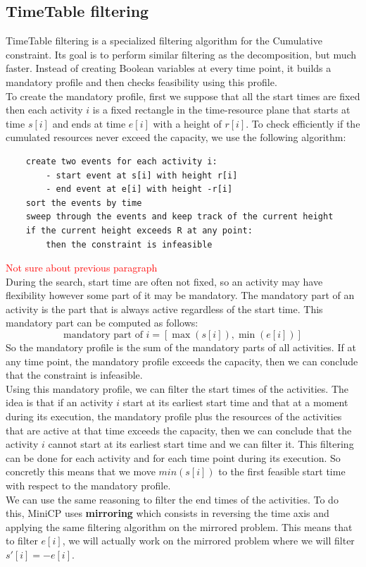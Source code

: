 \documentclass[12pt, openany]{report}
\theoremstyle{definition}
\begin{document}
\subsection{TimeTable filtering}
TimeTable filtering is a specialized filtering algorithm for the Cumulative constraint. Its goal is to perform similar filtering as the decomposition, but much faster. Instead of creating Boolean variables at every time point, it builds a mandatory profile and then checks feasibility using this profile.\\
To create the mandatory profile, first we suppose that all the start times are fixed then each activity $i$ is a fixed rectangle in the time-resource plane that starts at time $s[i]$ and ends at time $e[i]$ with a height of $r[i]$. To check efficiently if the cumulated resources never exceed the capacity, we use the following algorithm:
\begin{lstlisting}
    create two events for each activity i:
        - start event at s[i] with height r[i]
        - end event at e[i] with height -r[i]
    sort the events by time
    sweep through the events and keep track of the current height
    if the current height exceeds R at any point:
        then the constraint is infeasible
\end{lstlisting}
\textcolor{red}{Not sure about previous paragraph}\\
During the search, start time are often not fixed, so an activity may have flexibility however some part of it may be mandatory. The mandatory part of an activity is the part that is always active regardless of the start time. This mandatory part can be computed as follows:
\begin{equation}
    \text{mandatory part of } i = [\max(s[i]), \min(e[i])]
\end{equation}
So the mandatory profile is the sum of the mandatory parts of all activities. If at any time point, the mandatory profile exceeds the capacity, then we can conclude that the constraint is infeasible.\\
Using this mandatory profile, we can filter the start times of the activities. The idea is that if an activity $i$ start at its earliest start time and that at a moment during its execution, the mandatory profile plus the resources of the activities that are active at that time exceeds the capacity, then we can conclude that the activity $i$ cannot start at its earliest start time and we can filter it. This filtering can be done for each activity and for each time point during its execution. So concretly this means that we move $min(s[i])$ to the first feasible start time with respect to the mandatory profile.\\
We can use the same reasoning to filter the end times of the activities. To do this, MiniCP uses \textbf{mirroring} which consists in reversing the time axis and applying the same filtering algorithm on the mirrored problem. This means that to filter $e[i]$, we will actually work on the mirrored problem where we will filter $s'[i] = -e[i]$.
\end{document}
